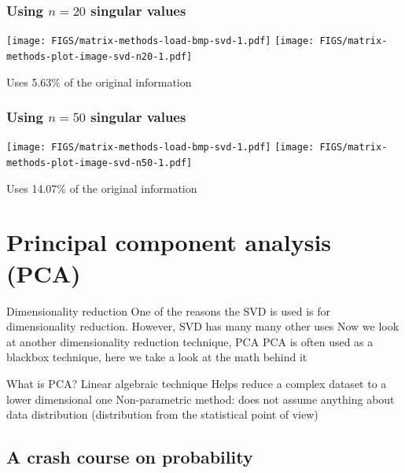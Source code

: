 \documentclass[aspectratio=169]{beamer}\usepackage[]{graphicx}\usepackage[]{xcolor}
\begin{document}
\begin{frame}\frametitle{Using $n=20$ singular values}
\begin{center}
\texttt{[image: FIGS/matrix-methods-load-bmp-svd-1.pdf]}
\texttt{[image: FIGS/matrix-methods-plot-image-svd-n20-1.pdf]}
\end{center}
\vfill
Uses 5.63\% of the original information
\end{frame}





\begin{frame}\frametitle{Using $n=50$ singular values}
\begin{center}
\texttt{[image: FIGS/matrix-methods-load-bmp-svd-1.pdf]}
\texttt{[image: FIGS/matrix-methods-plot-image-svd-n50-1.pdf]}
\end{center}
\vfill
Uses 14.07\% of the original information
\end{frame}




\section{Principal component analysis (PCA)}


\begin{frame}{Dimensionality reduction}
One of the reasons the SVD is used is for dimensionality reduction. However, SVD has many many other uses
\vfill
Now we look at another dimensionality reduction technique, PCA
\vfill
PCA is often used as a blackbox technique, here we take a look at the math behind it
\end{frame}


\begin{frame}{What is PCA?}
Linear algebraic technique 
\vfill
Helps reduce a complex dataset to a lower dimensional one
\vfill
Non-parametric method: does not assume anything about data distribution (distribution from the statistical point of view)
\end{frame}

\subsection{A crash course on probability}
\end{document}
